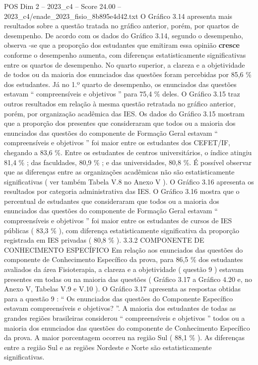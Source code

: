 \begin{textsample}{POS Dim 2 – 2023\_c4 – Score 24.00 – 2023\_c4/enade\_2023\_fisio\_8b895e4d42.txt}
O Gráfico 3.14 apresenta mais resultados sobre a questão tratada no gráfico anterior, porém, por quartos de desempenho.
De acordo com os dados do Gráfico 3.14, segundo o desempenho, observa -se que a proporção dos estudantes que emitiram essa opinião \textbf{cresce} conforme o desempenho aumenta, com diferenças estatisticamente significativas entre os quartos de desempenho.
No quarto superior, a clareza e a objetividade de todos ou da maioria dos enunciados das questões foram percebidas por 85,6 \% dos estudantes.
Já no 1.º quarto de desempenho, os enunciados das questões estavam “ compreensíveis e objetivos ” para 75,4 \% deles.
O Gráfico 3.15 traz outros resultados em relação à mesma questão retratada no gráfico anterior, porém, por organização acadêmica das IES.
Os dados do Gráfico 3.15 mostram que a proporção dos presentes que consideraram que todos ou a maioria dos enunciados das questões do componente de Formação Geral estavam “ compreensíveis e objetivos ” foi maior entre os estudantes dos CEFET/IF, chegando a 83,6 \%.
Entre os estudantes de centros universitários, o índice atingiu 81,4 \% ; das faculdades, 80,9 \% ; e das universidades, 80,8 \%.
É possível observar que as diferenças entre as organizações acadêmicas não são estatisticamente significativas ( ver também Tabela V.8 no Anexo V ).
O Gráfico 3.16 apresenta os resultados por categoria administrativa das IES.
O Gráfico 3.16 mostra que o percentual de estudantes que consideraram que todos ou a maioria dos enunciados das questões do componente de Formação Geral estavam “ compreensíveis e objetivos ” foi maior entre os estudantes de cursos de IES públicas ( 83,3 \% ), com diferença estatisticamente significativa da proporção registrada em IES privadas ( 80,8 \% ). 3.3.2 COMPONENTE DE CONHECIMENTO ESPECÍFICO Em relação aos enunciados das questões do componente de Conhecimento Específico da prova, para 86,5 \% dos estudantes avaliados da área Fisioterapia, a clareza e a objetividade ( questão 9 ) estavam presentes em todas ou na maioria das questões ( Gráfico 3.17 a Gráfico 4.20 e, no Anexo V, Tabelas V.9 e V.10 ).
O Gráfico 3.17 apresenta as respostas obtidas para a questão 9 : “ Os enunciados das questões do Componente Específico estavam compreensíveis e objetivos? ”.
A maioria dos estudantes de todas as grandes regiões brasileiras considerou “ compreensíveis e objetivos ” todos ou a maioria dos enunciados das questões do componente de Conhecimento Específico da prova.
A maior porcentagem ocorreu na região Sul ( 88,1 \% ).
As diferenças entre a região Sul e as regiões Nordeste e Norte são estatisticamente significativas.

\end{textsample}
